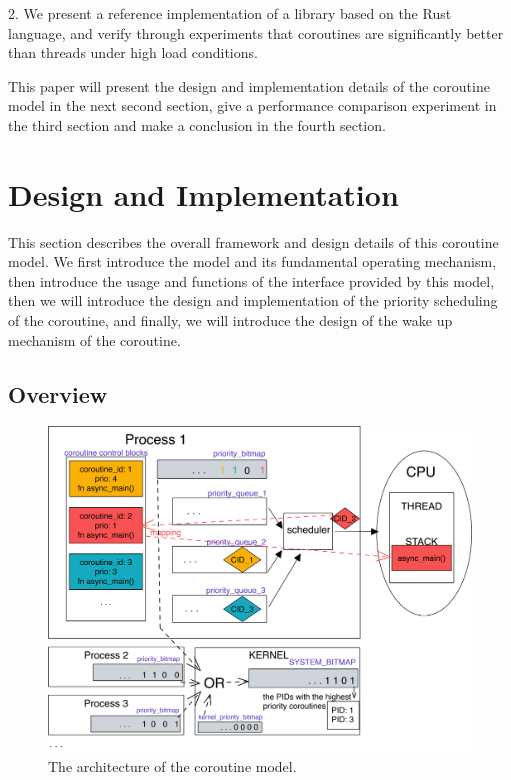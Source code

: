 \documentclass[10pt]{article}
\begin{document}
2. We present a reference implementation of a library based on the Rust language, and verify through experiments that coroutines are significantly better than threads under high load conditions.

This paper will present the design and implementation details of the coroutine model in the next second section, give a performance comparison experiment in the third section and make a conclusion in the fourth section.

\section{Design and Implementation}

This section describes the overall framework and design details of this coroutine model. We first introduce the model and its fundamental operating mechanism, then introduce the usage and functions of the interface provided by this model, then we will introduce the design and implementation of the priority scheduling of the coroutine, and finally, we will introduce the design of the wake up mechanism of the coroutine.

\subsection{Overview}

\begin{figure}[ht]
\begin{center}
\includegraphics[width=\columnwidth]{SDSS2021-LaTEX/overview.png}
\caption{The architecture of the coroutine model.}
\label{overview}
\end{center}
\end{figure}
\end{document}
